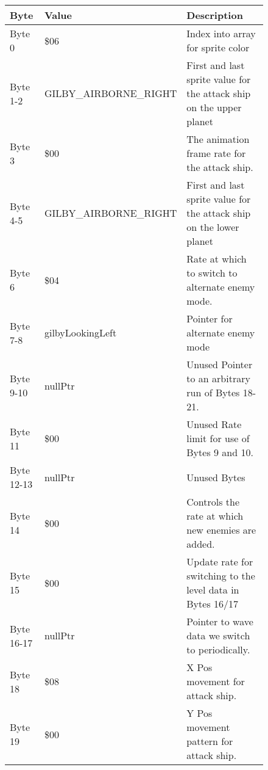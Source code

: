 \begin{figure}[H]
  {
  \setlength{\tabcolsep}{3.0pt}
  \setlength\cmidrulewidth{\heavyrulewidth} %
  \begin{adjustbox}{width=12cm}

\begin{tabular}{lll}
\toprule
 Byte       & Value                    & Description                                                         \\
\midrule
 Byte 0     & \$06                      & Index into array for sprite color                                   \\
 Byte 1-2   & GILBY\_AIRBORNE\_RIGHT     & First and last sprite value for the attack ship on the upper planet \\
 Byte 3     & \$00                      & The animation frame rate for the attack ship.                       \\
 Byte 4-5   & GILBY\_AIRBORNE\_RIGHT     & First and last sprite value for the attack ship on the lower planet \\
 Byte 6     & \$04                      & Rate at which to switch to alternate enemy mode.                    \\
 Byte 7-8   & gilbyLookingLeft         & Pointer for alternate enemy mode                                    \\
 Byte 9-10  & nullPtr                  & Unused Pointer to an arbitrary run of Bytes 18-21.                  \\
 Byte 11    & \$00                      & Unused Rate limit for use of Bytes 9 and 10.                        \\
 Byte 12-13 & nullPtr                  & Unused Bytes                                                        \\
 Byte 14    & \$00                      & Controls the rate at which new enemies are added.                   \\
 Byte 15    & \$00                      & Update rate for switching to the level data in Bytes 16/17          \\
 Byte 16-17 & nullPtr                  & Pointer to wave data we switch to periodically.                     \\
 Byte 18    & \$08                      & X Pos movement for attack ship.                                     \\
 Byte 19    & \$00                      & Y Pos movement pattern for attack ship.                             \\

\end{tabular}
\end{adjustbox}}
\end{figure}
